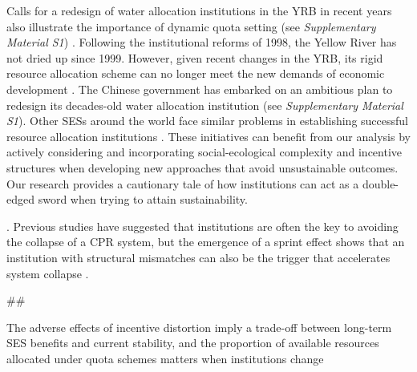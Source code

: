 Calls for a redesign of water allocation institutions in the YRB in recent years also illustrate the importance of dynamic quota setting (see \textit{Supplementary Material S1}) \cite{yuAdaptabilityassessmentpromotion2019}. Following the institutional reforms of 1998, the Yellow River has not dried up since 1999. However, given recent changes in the YRB, its rigid resource allocation scheme can no longer meet the new demands of economic development \cite{wangThingsCurrentSignificance2019}. The Chinese government has embarked on an ambitious plan to redesign its decades-old water allocation institution (see \textit{Supplementary Material S1}). Other SESs around the world face similar problems in establishing successful resource allocation institutions \cite{cummingQuantifyingSocialEcologicalScale2020, muneepeerakulStrategicbehaviorsgovernance2017, cummingAdvancingunderstandingnatural2020, leslieOperationalizingsocialecologicalsystems2015}. These initiatives can benefit from our analysis by actively considering and incorporating social-ecological complexity and incentive structures when developing new approaches that avoid unsustainable outcomes. Our research provides a cautionary tale of how institutions can act as a double-edged sword when trying to attain sustainability.


\cite{ostromRevisitingCommonsLocal1999,ostromGeneralFrameworkAnalyzing2009,castilla-rhoSocialtippingpoints2017}.
Previous studies have suggested that institutions are often the key to avoiding the collapse of a CPR system, but the emergence of a sprint effect shows that an institution with structural mismatches can also be the trigger that accelerates system collapse \cite{bodinConservationSuccessFunction2014,bodinCollaborativeenvironmentalgovernance2017,wangAlignmentsocialecological2019}.


##

The adverse effects of incentive distortion imply a trade-off between long-term SES benefits and current stability, and the proportion of available resources allocated under quota schemes matters when institutions change \cite{lade2013}
